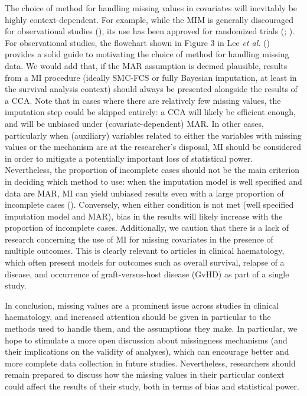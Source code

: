 \documentclass[
  letterpaper,
  paper=240mm:170mm,
  twoside=true,
  open=right,
  fontsize=10pt,
  pagesize=false,
  BCOR=15mm,
  DIV=14,
  headinclude=true,
  footinclude=false,
  headsepline=on]{scrbook}
\begin{document}
The choice of method for handling missing values in covariates will
inevitably be highly context-dependent. For example, while the MIM is
generally discouraged for observational studies
(), its use has been approved for randomized trials
(; ). For observational studies, the flowchart shown in
Figure 3 in Lee \emph{et al.}
() provides a
solid guide to motivating the choice of method for handling missing
data. We would add that, if the MAR assumption is deemed plausible,
results from a MI procedure (ideally SMC-FCS or fully Bayesian
imputation, at least in the survival analysis context) should always be
presented alongside the results of a CCA. Note that in cases where there
are relatively few missing values, the imputation step could be skipped
entirely: a CCA will likely be efficient enough, and will be unbiased
under (covariate-dependent) MAR. In other cases, particularly when
(auxiliary) variables related to either the variables with missing
values or the mechanism are at the researcher's disposal, MI should be
considered in order to mitigate a potentially important loss of
statistical power. Nevertheless, the proportion of incomplete cases
should not be the main criterion in deciding which method to use: when
the imputation model is well specified and data are MAR, MI can yield
unbiased results even with a large proportion of incomplete cases
(). Conversely, when either condition is not met
(well specified imputation model and MAR), bias in the results will
likely increase with the proportion of incomplete cases. Additionally,
we caution that there is a lack of research concerning the use of MI for
missing covariates in the presence of multiple outcomes. This is clearly
relevant to articles in clinical haematology, which often present models
for outcomes such as overall survival, relapse of a disease, and
occurrence of graft-versus-host disease (GvHD) as part of a single
study.

In conclusion, missing values are a prominent issue across studies in
clinical haematology, and increased attention should be given in
particular to the methods used to handle them, and the assumptions they
make. In particular, we hope to stimulate a more open discussion about
missingness mechanisms (and their implications on the validity of
analyses), which can encourage better and more complete data collection
in future studies. Nevertheless, researchers should remain prepared to
discuss how the missing values in their particular context could affect
the results of their study, both in terms of bias and statistical power.
\end{document}
